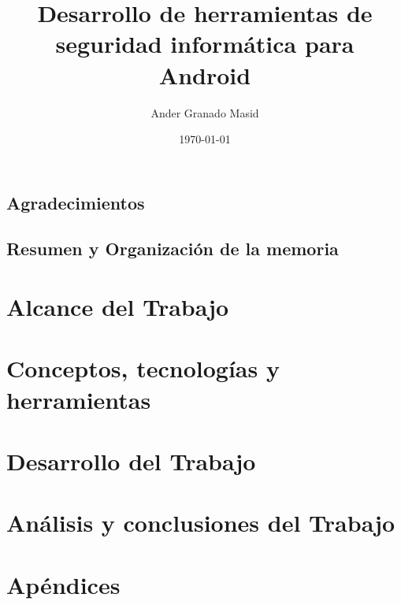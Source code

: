 \documentclass[a4paper,12pt,twoside]{scrbook}
\title{Desarrollo de herramientas de seguridad informática para Android}
\author{Ander Granado Masid}
\date{\today}
\begin{document}
\frontmatter

\chapter{Agradecimientos}
\tableofcontents
\listoffigures
\chapter[Resumen]{Resumen y Organización de la memoria}



\mainmatter

\part{Alcance del Trabajo}



\part{Conceptos, tecnologías y herramientas}




\part{Desarrollo del Trabajo}

\part{Análisis y conclusiones del Trabajo}

\part{Apéndices}



\backmatter



\end{document}
